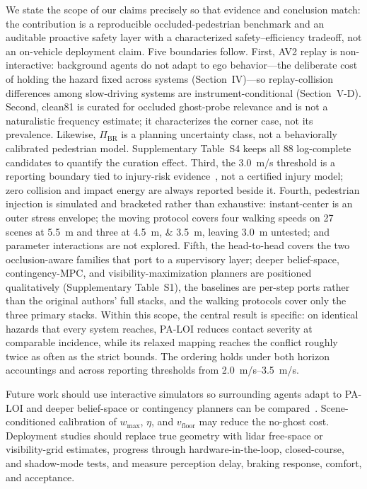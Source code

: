 \documentclass[journal]{IEEEtran}
\begin{document}
We state the scope of our claims precisely so that evidence and conclusion match: the contribution is a reproducible occluded-pedestrian benchmark and an auditable proactive safety layer with a characterized safety--efficiency tradeoff, not an on-vehicle deployment claim. Five boundaries follow. First, AV2 replay is non-interactive: background agents do not adapt to ego behavior---the deliberate cost of holding the hazard fixed across systems (Section~IV)---so replay-collision differences among slow-driving systems are instrument-conditional (Section~V-D). Second, clean81 is curated for occluded ghost-probe relevance and is not a naturalistic frequency estimate; it characterizes the corner case, not its prevalence. Likewise, $\Pi_{\mathrm{BR}}$ is a planning uncertainty class, not a behaviorally calibrated pedestrian model. Supplementary Table~S4 keeps all 88 log-complete candidates to quantify the curation effect. Third, the \SI{3.0}{m/s} threshold is a reporting boundary tied to injury-risk evidence~\cite{rosen2009fatality}, not a certified injury model; zero collision and impact energy are always reported beside it. Fourth, pedestrian injection is simulated and bracketed rather than exhaustive: instant-center is an outer stress envelope; the moving protocol covers four walking speeds on 27 scenes at \SI{5.5}{m} and three at \SIlist{4.5;3.5}{m}, leaving \SI{3.0}{m} untested; and parameter interactions are not explored. Fifth, the head-to-head covers the two occlusion-aware families that port to a supervisory layer; deeper belief-space, contingency-MPC, and visibility-maximization planners are positioned qualitatively (Supplementary Table~S1), the baselines are per-step ports rather than the original authors' full stacks, and the walking protocols cover only the three primary stacks. Within this scope, the central result is specific: on identical hazards that every system reaches, PA-LOI reduces contact severity at comparable incidence, while its relaxed mapping reaches the conflict roughly twice as often as the strict bounds. The ordering holds under both horizon accountings and across reporting thresholds from \SIrange{2.0}{3.5}{m/s}.

Future work should use interactive simulators so surrounding agents adapt to PA-LOI and deeper belief-space or contingency planners can be compared~\cite{dosovitskiy2017carla,karnchanachari2024nuplan,althoff2017commonroad,zhang2021pomdp,zheng2026occlusioncontingency}. Scene-conditioned calibration of $w_{\max}$, $\eta$, and $v_{\mathrm{floor}}$ may reduce the no-ghost cost. Deployment studies should replace true geometry with lidar free-space or visibility-grid estimates, progress through hardware-in-the-loop, closed-course, and shadow-mode tests, and measure perception delay, braking response, comfort, and acceptance.
\end{document}
